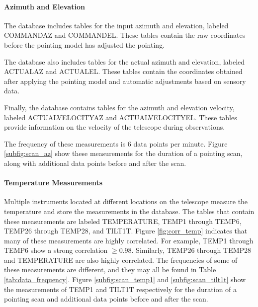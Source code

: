\paragraph{Azimuth and Elevation}
The database includes tables for the input azimuth and elevation, labeled COMMANDAZ and COMMANDEL.
These tables contain the raw coordinates before the pointing model has adjusted the pointing.

The database also includes tables for the actual azimuth and elevation, labeled ACTUALAZ and ACTUALEL.
These tables contain the coordinates obtained after applying the pointing model and automatic adjustments based on sensory data.

Finally, the database contains tables for the azimuth and elevation velocity, labeled ACTUALVELOCITYAZ and ACTUALVELOCITYEL.
These tables provide information on the velocity of the telescope during observations.

The frequency of these measurements is $6$ data points per minute.
Figure \ref{subfig:scan_az} show these measurements for the duration of a pointing scan, along with additional data points before and after the scan.


\paragraph{Temperature Measurements}
Multiple instruments located at different locations on the telescope measure the temperature and store the measurements in the database.
The tables that contain these measurements are labeled TEMPERATURE, TEMP1 through TEMP6, TEMP26 through TEMP28, and TILT1T. 
Figure \ref{fig:corr_temp} indicates that many of these measurements are highly correlated.
For example, TEMP1 through TEMP6 show a strong correlation $\geq 0.98$.
Similarly, TEMP26 through TEMP28 and TEMPERATURE are also highly correlated.
The frequencies of some of these measurements are different, and they may all be found in Table \ref{tab:data_frequency}.
Figure \ref{subfig:scan_temp1} and \ref{subfig:scan_tilt1t} show the measurements of TEMP1 and TILT1T respectively
for the duration of a pointing scan and additional data points before and after the scan.


